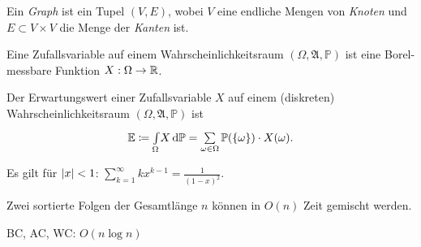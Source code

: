 \documentclass{cheat-sheet}
\newcommand{\Alg}{\mathfrak{A}} %
\renewcommand{\P}{\mathbb{P}} %
\newcommand{\E}{\mathbb{E}} %
\begin{document}

\begin{defn}
  Ein \emph{Graph} ist ein Tupel $(V, E)$, wobei $V$ eine endliche Mengen von \emph{Knoten} und $E \subset V \times V$ die Menge der \emph{Kanten} ist.
\end{defn}



\begin{defn}
  Eine Zufallsvariable auf einem Wahrscheinlichkeitsraum $(\Omega, \Alg, \P)$ ist eine Borel-messbare Funktion $X : \Omega \to \mathbb{R}$.
\end{defn}

\begin{defn}
  Der Erwartungswert einer Zufallsvariable $X$ auf einem (diskreten) Wahrscheinlichkeitsraum $(\Omega, \Alg, \P)$ ist
  \[ \E \coloneqq \Int{\Omega}{}{X}{\P} = \sum_{\omega \in \Omega} \P(\{ \omega \}) \cdot X(\omega). \]
\end{defn}


\begin{bem}
  Es gilt für $\lvert x\rvert < 1$: $\sum_{k=1}^\infty k x^{k{-}1} = \tfrac{1}{(1-x)^2}$.
\end{bem}





\begin{alg}
  Zwei sortierte Folgen der Gesamtlänge $n$ können in $O(n)$ Zeit gemischt werden.
\end{alg}

\begin{alg}[Mergesort]
  BC, AC, WC: $O(n \log n)$
\end{alg}

\end{document}
